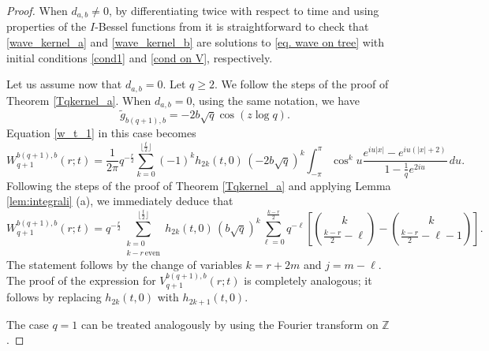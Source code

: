 \documentclass[12pt]{amsart}
\numberwithin{equation}{section}
\theoremstyle{boldremark}
\begin{document}
\begin{proof}
When $d_{a,b} \neq 0$, by differentiating twice with respect to time and using properties of the $I$-Bessel functions from \cite[Lemma 3.1]{CHJSV} it is straightforward to check that \eqref{wave_kernel_a} and \eqref{wave_kernel_b} are solutions to \eqref{eq. wave on tree} with initial conditions \eqref{cond1} and \eqref{cond on V}, respectively. 

Let us assume now that $d_{a,b}=0$. Let $q\geq 2$. We follow the steps of the proof of Theorem \ref{Tqkernel_a}. When $d_{a,b}=0$, using the same notation, we have
    $$
    \widetilde g_{b(q+1),b}= -2b\sqrt{q}\cos(z\log q).
    $$
    Equation \eqref{w_t_1} in this case becomes
$$
W^{b(q+1),b}_{q+1}\left(r;t\right)
=\frac{1}{2\pi}q^{-\frac{r}{2}}\sum_{k=0}^{\lfloor \frac{t}{2} \rfloor} (-1)^k h_{2k}\left(t,0\right)\,(-2b\sqrt{q})^k
\int_{-\pi}^{\pi} \cos^k u\frac{e^{iu|x|}-e^{iu(|x|+2)}}{1-\frac{1}{q}e^{2iu}} \,du.
$$
Following the steps of the proof of Theorem \ref{Tqkernel_a} and applying Lemma \ref{lem:integrali} (a), we immediately deduce that
$$
W^{b(q+1),b}_{q+1}\left(r;t\right)
=q^{-\frac{r}{2}}\sum_{ \substack{k=0 \\ k-r\,\text{even}} }^{\lfloor \frac{t}{2} \rfloor}  h_{2k}\left(t,0\right)\,(b\sqrt{q})^k \sum_{\ell=0}^{ \frac{k-r}{2}}q^{-\ell}\left[\binom{k}{\frac{k-r}{2}-\ell}-\binom{k}{\frac{k-r}{2}-\ell-1}\right].
$$
The statement follows by the change of variables $k=r+2m$ and $j=m-\ell$. The proof of the expression for $V^{b(q+1),b}_{q+1}\left(r;t\right)$ is completely analogous; it follows by replacing $h_{2k}(t,0)$ with $h_{2k+1}(t,0)$.

The case $q=1$ can be treated analogously by using the Fourier transform on $\mathbb Z$.
\end{proof}
\end{document}
